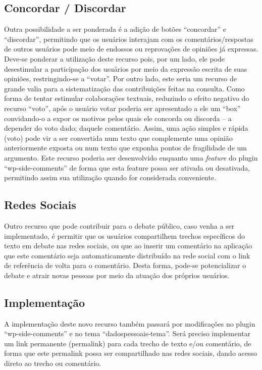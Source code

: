 \subsection{Concordar / Discordar}
Outra possibilidade a ser ponderada é a adição de botões ``concordar'' e ``discordar'', permitindo que os usuários interajam com os comentários/respostas de outros usuários pode meio de endossos ou reprovações de opiniões já expressas.
	Deve-se ponderar a utilização deste recurso pois, por um lado, ele pode desestimular a participação dos usuários por meio da expressão escrita de suas opiniões, restringindo-se a ``votar''. Por outro lado, este seria um recurso de grande valia para a sistematização das contribuições feitas na consulta.
	Como forma de tentar estimular colaborações textuais, reduzindo o efeito negativo do recurso ``voto'', após o usuário votar poderia ser apresentado a ele um ``box'' convidando-o a expor os motivos pelos quais ele concorda ou discorda – a depender do voto dado; daquele comentário. Assim, uma ação simples e rápida (voto) pode vir a ser convertida num texto que complemente uma opinião anteriormente exposta ou num texto que exponha pontos de fragilidade de um argumento.
	Este recurso poderia ser desenvolvido enquanto uma \textit{feature} do plugin ``wp-side-comments'' de forma que esta feature possa ser ativada ou desativada, permitindo assim sua utilização quando for considerada conveniente.
	
\subsection{Redes Sociais}
Outro recurso que pode contribuir para o debate público, caso venha a ser implementado, é permitir que os usuários compartilhem trechos específicos do texto em debate nas redes sociais, ou que ao inserir um comentário na aplicação que este comentário seja automaticamente distribuído na rede social com o link de referência de volta para o comentário. Desta forma, pode-se potencializar o debate e atrair novas pessoas por meio da atuação dos próprios usuários.

\subsection{Implementação}
	A implementação deste novo recurso também passará por modificações no plugin ``wp-side-comments'' e no tema ``dadospessoais-tema''. Será preciso implementar um link permanente (permalink) para cada trecho de texto e/ou comentário, de forma que este permalink possa ser compartilhado nas redes sociais, dando acesso direto ao trecho ou comentário.